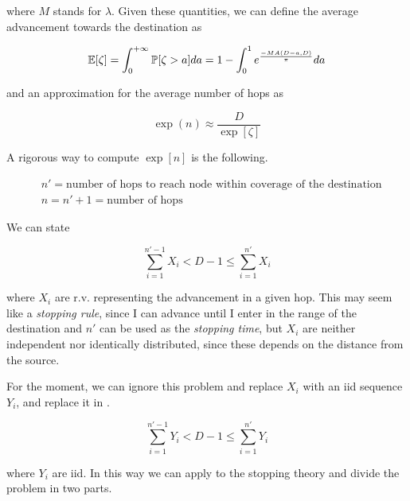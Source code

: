 	where $M$ stands for $\lambda$. Given these quantities, we can define the average advancement towards the destination as

	\begin{equation}
		\mathbb{E}[\zeta] = \int_0^{+\infty} \mathbb{P}[\zeta > a]da = 1-\int_0^1 e^{\frac{-MA(D-a,D)}{\pi}}da
	\end{equation}

	and an approximation for the average number of hops as

	\begin{equation}
		\exp(n) \approx \frac{D}{\exp[\zeta]}
	\end{equation}

A rigorous way to compute $\exp[n]$ is the following.

\begin{equation}\label{hopsdefinition}
	\begin{split}
		&n' = \text{number of hops to reach node within coverage of the destination}\\
		&n = n' + 1 = \text{number of hops}
	\end{split}
\end{equation}

We can state

\begin{equation}\label{firstBound}
	\sum_{i=1}^{n'-1} X_i < D-1 \le \sum_{i=1}^{n'} X_i
\end{equation}

where $X_i$ are r.v. representing the advancement in a given hop.
This may seem like a \textit{stopping rule}, since I can advance until I enter in the range of the destination and $n'$ can be used as the \textit{stopping time}, but $X_i$ are neither independent nor identically distributed, since these depends on the distance from the source.

For the moment, we can ignore this problem and replace $X_i$ with an iid sequence $Y_i$, and replace it in .

\begin{equation}\label{stoppingRule}
	\sum_{i=1}^{n'-1} Y_i < D-1 \le \sum_{i=1}^{n'} Y_i
\end{equation}

where $Y_i$ are iid.
In this way we can apply to  the stopping theory and divide the problem in two parts.

